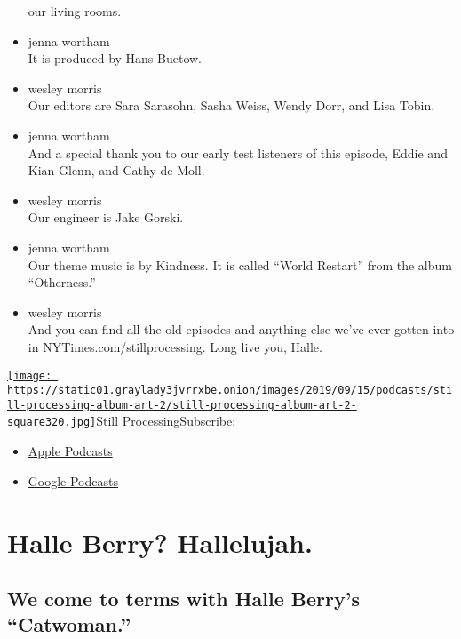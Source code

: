 \begin{itemize}
  our living rooms.
\item
  jenna wortham\\
  It is produced by Hans Buetow.
\item
  wesley morris\\
  Our editors are Sara Sarasohn, Sasha Weiss, Wendy Dorr, and Lisa
  Tobin.
\item
  jenna wortham\\
  And a special thank you to our early test listeners of this episode,
  Eddie and Kian Glenn, and Cathy de Moll.
\item
  wesley morris\\
  Our engineer is Jake Gorski.
\item
  jenna wortham\\
  Our theme music is by Kindness. It is called ``World Restart'' from
  the album ``Otherness.''
\item
  wesley morris\\
  And you can find all the old episodes and anything else we've ever
  gotten into in NYTimes.com/stillprocessing. Long live you, Halle.
\end{itemize}

\href{https://www.nytimes3xbfgragh.onion/column/still-processing-podcast}{\texttt{[image: https://static01.graylady3jvrrxbe.onion/images/2019/09/15/podcasts/still-processing-album-art-2/still-processing-album-art-2-square320.jpg]}Still
Processing}Subscribe:

\begin{itemize}
\tightlist
\item
  \href{https://itunes.apple.com/us/podcast/id1151436460}{Apple
  Podcasts}
\item
  \href{https://www.google.com/podcasts?feed=aHR0cHM6Ly9yc3MuYXJ0MTkuY29tL255dC1zdGlsbC1wcm9jZXNzaW5n}{Google
  Podcasts}
\end{itemize}

\hypertarget{halle-berry-hallelujah-1}{%
\section{Halle Berry? Hallelujah.}\label{halle-berry-hallelujah-1}}

\hypertarget{we-come-to-terms-with-halle-berrys-catwoman-1}{%
\subsection{We come to terms with Halle Berry's
``Catwoman.''}\label{we-come-to-terms-with-halle-berrys-catwoman-1}}

